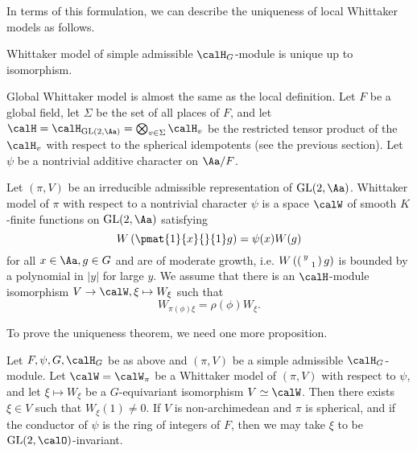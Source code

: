 In terms of this formulation, we can describe the uniqueness of local Whittaker models as follows. 
\begin{proposition}
Whittaker model of simple admissible $\calH_{G}$-module is unique up to isomorphism. 
\end{proposition}

Global Whittaker model is almost the same as the local definition. 
Let $F$ be a global field, let $\Sigma$ be the set of all places of $F$, and let $\calH = \calH_{\GL(2, \Aa)} = \bigotimes_{v\in \Sigma} \calH_{v}$ be the restricted tensor product of the $\calH_v$ with respect to the spherical idempotents (see the previous section). 
Let $\psi$ be a nontrivial additive character on $\Aa/F$. 
\begin{definition}
Let $(\pi, V)$ be an irreducible admissible representation of $\GL(2, \Aa)$. 
Whittaker model of $\pi$ with respect to a nontrivial character $\psi$  is a space $\calW$ of smooth $K$-finite functions on $\GL(2, \Aa)$ satisfying 
$$
W\left( \pmat{1}{x}{}{1} g\right) = \psi(x)W(g)
$$
for all $x\in \Aa, g\in G$ and are of moderate growth, i.e. $W\left( \left(\begin{smallmatrix} y &  \\  & 1 \end{smallmatrix}\right) g\right)$ is bounded by a polynomial in $|y|$ for large $y$. We assume that there is an $\calH$-module isomorphism $V \to \calW, \xi\mapsto W_{\xi}$ such that 
$$
W_{\pi(\phi)\xi} = \rho(\phi) W_{\xi}. 
$$
\end{definition}
To prove the uniqueness theorem, we need one more proposition. 
\begin{proposition}
Let $F, \psi, G, \calH_{G}$ be as above and $(\pi, V)$ be a simple admissible $\calH_{G}$-module. 
Let $\calW = \calW_{\pi}$ be a Whittaker model of $(\pi, V)$ with respect to $\psi$, and let $\xi\mapsto W_{\xi}$ be a $G$-equivariant isomorphism $V\simeq\calW$. 
Then there exists $\xi\in V$ such that $W_{\xi}(1) \neq 0$. 
If $V$ is non-archimedean and $\pi$ is spherical, and if the conductor of $\psi$ is the ring of integers of $F$, then we may take $\xi$ to be $\GL(2, \calO)$-invariant. 
\end{proposition}
